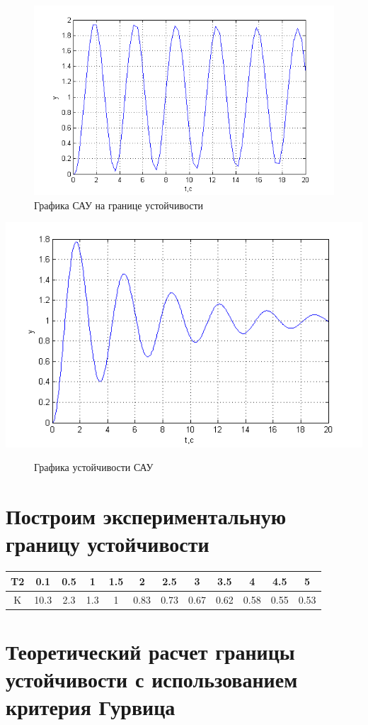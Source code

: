 \documentclass[a4paper, 11pt] {article}
\begin{document}
\begin{figure}[h]
	\centering
	\includegraphics[width=0.7\linewidth]{2}
	\caption{Графика САУ на границе устойчивости}
	\label{fig:2}
\end{figure}

\begin{center}
	\includegraphics[width=0.7\linewidth]{3}
\begin{figure}[h]
		\caption{Графика устойчивости САУ}
	\label{fig:3}
\end{figure}
\end{center}

\section{Построим экспериментальную границу устойчивости}
\begin{center}
\begin{tabular}{|c|c|c|c|c|c|c|c|c|c|c|c|}
	\hline 
	T2 & 0.1 & 0.5 & 1 & 1.5 & 2 & 2.5 & 3 & 3.5 & 4 & 4.5 & 5 \\ 
	\hline 
	K & 10.3 & 2.3 & 1.3 & 1 & 0.83 & 0.73 & 0.67 & 0.62 & 0.58 & 0.55 & 0.53 \\ 
	\hline 
\end{tabular} 
\end{center}
\section{Теоретический расчет границы устойчивости с использованием критерия Гурвица}
\end{document}
